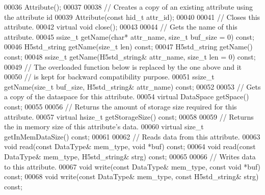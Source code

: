 \begin{DoxyCode}
00036         Attribute();
00037 
00038         \textcolor{comment}{// Creates a copy of an existing attribute using the attribute id}
00039         Attribute(\textcolor{keyword}{const} hid\_t attr\_id);
00040 
00041         \textcolor{comment}{// Closes this attribute.}
00042         \textcolor{keyword}{virtual} \textcolor{keywordtype}{void} close();
00043 
00044         \textcolor{comment}{// Gets the name of this attribute.}
00045         ssize\_t getName(\textcolor{keywordtype}{char}* attr\_name, \textcolor{keywordtype}{size\_t} buf\_size = 0) \textcolor{keyword}{const};
00046         H5std\_string getName(\textcolor{keywordtype}{size\_t} len) \textcolor{keyword}{const};
00047         H5std\_string getName() \textcolor{keyword}{const};
00048         ssize\_t getName(H5std\_string& attr\_name, \textcolor{keywordtype}{size\_t} len = 0) \textcolor{keyword}{const};
00049         \textcolor{comment}{// The overloaded function below is replaced by the one above and it}
00050         \textcolor{comment}{// is kept for backward compatibility purpose.}
00051         ssize\_t getName(\textcolor{keywordtype}{size\_t} buf\_size, H5std\_string& attr\_name) \textcolor{keyword}{const};
00052 
00053         \textcolor{comment}{// Gets a copy of the dataspace for this attribute.}
00054         \textcolor{keyword}{virtual} DataSpace getSpace() \textcolor{keyword}{const};
00055 
00056         \textcolor{comment}{// Returns the amount of storage size required for this attribute.}
00057         \textcolor{keyword}{virtual} hsize\_t getStorageSize() \textcolor{keyword}{const};
00058 
00059         \textcolor{comment}{// Returns the in memory size of this attribute's data.}
00060         \textcolor{keyword}{virtual} \textcolor{keywordtype}{size\_t} getInMemDataSize() \textcolor{keyword}{const};
00061 
00062         \textcolor{comment}{// Reads data from this attribute.}
00063         \textcolor{keywordtype}{void} read(\textcolor{keyword}{const} DataType& mem\_type, \textcolor{keywordtype}{void} *buf) \textcolor{keyword}{const};
00064         \textcolor{keywordtype}{void} read(\textcolor{keyword}{const} DataType& mem\_type, H5std\_string& strg) \textcolor{keyword}{const};
00065 
00066         \textcolor{comment}{// Writes data to this attribute.}
00067         \textcolor{keywordtype}{void} write(\textcolor{keyword}{const} DataType& mem\_type, \textcolor{keyword}{const} \textcolor{keywordtype}{void} *buf) \textcolor{keyword}{const};
00068         \textcolor{keywordtype}{void} write(\textcolor{keyword}{const} DataType& mem\_type, \textcolor{keyword}{const} H5std\_string& strg) \textcolor{keyword}{const};

\end{DoxyCode}
